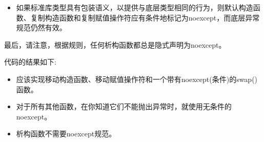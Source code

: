 \begin{itemize}
	\item 如果标准库类型具有包装语义，以提供与底层类型相同的行为，则默认构造函数、复制构造函数和复制赋值操作符应有条件地标记为noexcept，而底层异常规范仍然有效。
\end{itemize}

最后，请注意，根据规则，任何析构函数都总是隐式声明为noexcept。\par

代码的结果如下:\par

\begin{itemize}
	\item 应该实现移动构造函数、移动赋值操作符和一个带有noexcept(条件)的swap()函数。
	\item 对于所有其他函数，在你知道它们不能抛出异常时，就使用无条件的noexcept。
	\item 析构函数不需要noexcept规范。
\end{itemize}







